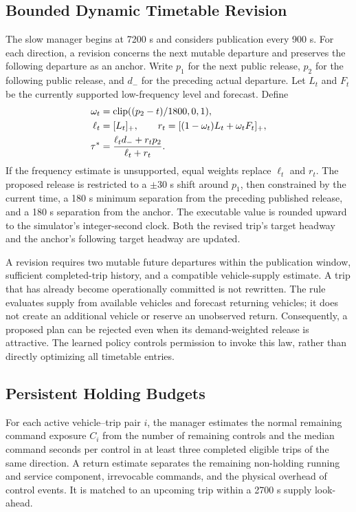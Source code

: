 \subsection{Bounded Dynamic Timetable Revision}
The slow manager begins at 7200 s and considers publication every 900 s. For each direction, a revision concerns the next mutable departure and preserves the following departure as an anchor. Write $p_1$ for the next public release, $p_2$ for the following public release, and $d_-$ for the preceding actual departure. Let $L_t$ and $F_t$ be the currently supported low-frequency level and forecast. Define
\begin{align}
 \omega_t&=\operatorname{clip}((p_2-t)/1800,0,1),\\
 \ell_t&=[L_t]_+,\qquad r_t=[(1-\omega_t)L_t+\omega_t F_t]_+,\\
 \tau^*&=\frac{\ell_t d_-+r_t p_2}{\ell_t+r_t}.
 \label{eq:timetable}
\end{align}
If the frequency estimate is unsupported, equal weights replace $\ell_t$ and $r_t$. The proposed release is restricted to a $\pm30$ s shift around $p_1$, then constrained by the current time, a 180 s minimum separation from the preceding published release, and a 180 s separation from the anchor. The executable value is rounded upward to the simulator's integer-second clock. Both the revised trip's target headway and the anchor's following target headway are updated.

A revision requires two mutable future departures within the publication window, sufficient completed-trip history, and a compatible vehicle-supply estimate. A trip that has already become operationally committed is not rewritten. The rule evaluates supply from available vehicles and forecast returning vehicles; it does not create an additional vehicle or reserve an unobserved return. Consequently, a proposed plan can be rejected even when its demand-weighted release is attractive. The learned policy controls permission to invoke this law, rather than directly optimizing all timetable entries.

\subsection{Persistent Holding Budgets}
For each active vehicle--trip pair $i$, the manager estimates the normal remaining command exposure $C_i$ from the number of remaining controls and the median command seconds per control in at least three completed eligible trips of the same direction. A return estimate separates the remaining non-holding running and service component, irrevocable commands, and the physical overhead of control events. It is matched to an upcoming trip within a 2700 s supply look-ahead.

